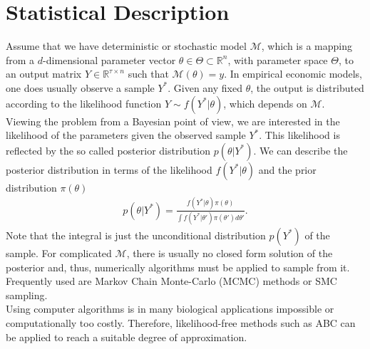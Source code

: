 \documentclass[11pt, a4paper, leqno]{article}
\begin{document}

\section{Statistical Description}
\label{sec:stat_description}
Assume that we have deterministic or stochastic model $\mathcal{M}$, which is a mapping from a $d$-dimensional parameter vector $\theta \in \Theta \subset \mathbb{R}^n$, with parameter space $\Theta$, to an output matrix $Y \in \mathbb{R}^{\tau \times n}$ such that $\mathcal{M}(\theta) = y$. In empirical economic models, one does usually observe a sample $Y^*$. Given any fixed $\theta$, the output is distributed according to the likelihood function $Y \sim f(Y^*| \theta)$, which depends on $\mathcal{M}$. \\
Viewing the problem from a Bayesian point of view, we are interested in the likelihood of the parameters given the observed sample $Y^*$. This likelihood is reflected by the so called posterior distribution $p(\theta|Y^*)$. We can describe the posterior distribution in terms of the likelihood $f(Y^*| \theta)$ and the prior distribution $\pi(\theta)$
\begin{align}
    p(\theta|Y^*) = \frac{f(Y^*| \theta) \pi(\theta) }{\int f(Y^*| \theta') \pi(\theta') d\theta'}.
\end{align}
Note that the integral is just the unconditional distribution $p(Y^*)$ of the sample. For complicated $\mathcal{M}$, there is usually no closed form solution of the posterior and, thus, numerically algorithms must be applied to sample from it. Frequently used are Markov Chain Monte-Carlo (MCMC) methods or SMC sampling. \\
Using computer algorithms is in many biological applications impossible or computationally too costly. Therefore, likelihood-free methods such as ABC can be applied to reach a suitable degree of approximation.
\end{document}
